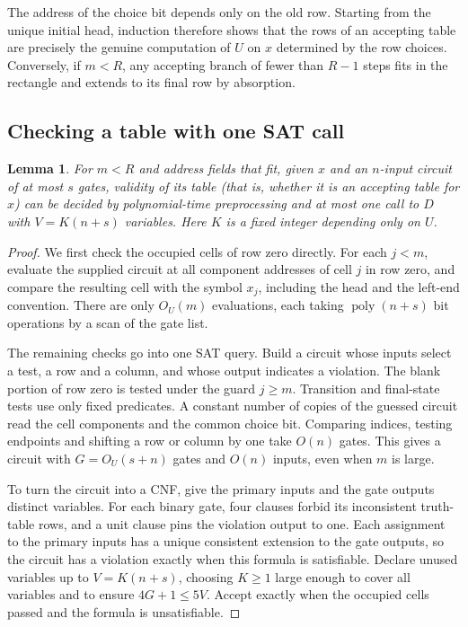 \documentclass[12pt,letterpaper]{article}
\newtheorem{lemma}[theorem]{Lemma}
\newcommand{\poly}{\operatorname{poly}}
\begin{document}
The address of the choice bit depends only on the old row. Starting from the
unique initial head, induction therefore shows that the rows of an accepting
table are precisely the genuine computation of \(U\) on \(x\) determined by
the row choices. Conversely, if \(m<R\), any accepting branch of fewer than
\(R-1\) steps fits in the rectangle and extends to its final row by
absorption.

\subsection{Checking a table with one SAT call}

\begin{lemma}\label{lem:checker}
For \(m<R\) and address fields that fit, given \(x\) and an \(n\)-input
circuit of at most \(s\) gates, validity of its table (that is, whether it
is an accepting table for \(x\)) can be decided by polynomial-time
preprocessing and at most one call to \(D\) with \(V=K(n+s)\) variables.
Here \(K\) is a fixed integer depending only on \(U\).
\end{lemma}
\begin{proof}
We first check the occupied cells of row zero directly. For each \(j<m\),
evaluate the supplied circuit at all component addresses of cell \(j\) in
row zero, and compare the resulting cell with the symbol \(x_j\), including
the head and the left-end convention. There are only \(O_U(m)\)
evaluations, each taking \(\poly(n+s)\) bit operations by a scan of the
gate list.

The remaining checks go into one SAT query. Build a circuit whose inputs
select a test, a row and a column, and whose output indicates a violation.
The blank portion of row zero is tested under the guard \(j\ge m\).
Transition and final-state tests use only fixed predicates. A constant
number of copies of the guessed circuit read the cell components and the
common choice bit. Comparing indices, testing endpoints and shifting a row
or column by one take \(O(n)\) gates. This gives a circuit with
\(G=O_U(s+n)\) gates and \(O(n)\) inputs, even when \(m\) is large.

To turn the circuit into a CNF, give the primary inputs and the gate
outputs distinct variables. For each binary gate, four clauses forbid its
inconsistent truth-table rows, and a unit clause pins the violation output
to one. Each assignment to the primary inputs has a unique consistent
extension to the gate outputs, so the circuit has a violation exactly when
this formula is satisfiable. Declare unused variables up to \(V=K(n+s)\),
choosing \(K\ge1\) large enough to cover all variables and to ensure
\(4G+1\le 5V\). Accept exactly when the occupied cells passed and the
formula is unsatisfiable.
\end{proof}
\end{document}
